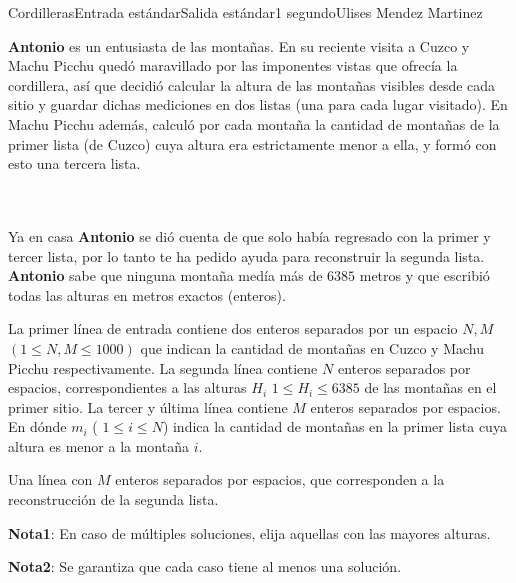 \begin{problem}{Cordilleras}{Entrada estándar}{Salida estándar}{1 segundo}{}{Ulises Mendez Martinez}

\textbf{Antonio} es un entusiasta de las montañas. En su reciente visita a Cuzco y Machu Picchu quedó maravillado por las imponentes vistas que ofrecía la cordillera, así que decidió calcular la altura de las montañas visibles desde cada sitio y guardar dichas mediciones en dos listas (una para cada lugar visitado). En Machu Picchu además, calculó por cada montaña la cantidad de montañas de la primer lista (de Cuzco) cuya altura era estrictamente menor a ella, y formó con esto una tercera lista.

\\ \\

Ya en casa \textbf{Antonio} se dió cuenta de que solo había regresado con la primer y tercer lista, por lo tanto te ha pedido ayuda para reconstruir la segunda lista. \textbf{Antonio} sabe que ninguna montaña medía más de $6385$ metros y que escribió todas las alturas en metros exactos (enteros).


\InputFile

La primer línea de entrada contiene dos enteros separados por un espacio $N, M$ $(1 \le N, M \le 1000)$ que indican la cantidad de montañas en Cuzco y Machu Picchu respectivamente.
La segunda línea contiene $N$ enteros separados por espacios, correspondientes a las alturas $H_i$ $1 \le H_i \le 6385$ de las montañas en el primer sitio.
La tercer y última línea contiene $M$ enteros separados por espacios. En dónde $m_i$ ( $1 \le i \le N$) indica la cantidad de montañas en la primer lista cuya altura es menor a la montaña $i$.

\OutputFile

Una línea con $M$ enteros separados por espacios, que corresponden a la reconstrucción de la segunda lista.

\textbf{Nota1}: En caso de múltiples soluciones, elija aquellas con las mayores alturas.


\textbf{Nota2}: Se garantiza que cada caso tiene al menos una solución.


\Example

\begin{example}
\end{example}



\end{problem}

